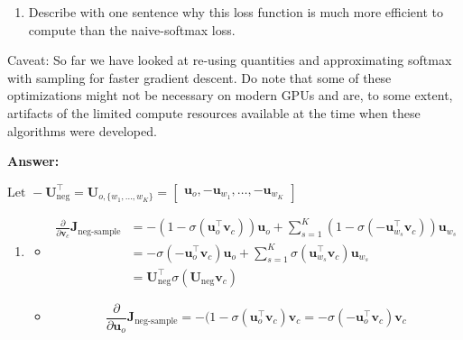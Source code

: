 \documentclass{article}
\newenvironment{answer}{
    {\bf Answer:} \sf \begingroup\color{black}
}{\endgroup}%
\begin{document}
\begin{enumerate}[label=(\alph*)]
\begin{enumerate}[label=(\roman*)]
              \item Describe with one sentence why this loss function is much more efficient to compute than the naive-softmax loss.
          \end{enumerate}

          Caveat: So far we have looked at re-using quantities and approximating softmax with sampling for faster gradient descent. Do note that some of these optimizations might not be necessary on modern GPUs and are, to some extent, artifacts of the limited compute resources available at the time when these algorithms were developed.

          \begin{shaded}
              \begin{answer}
                  $\text{Let } -\bm U_{\text{neg}}^\top = \bm{U}_{o, \{w_1, \dots, w_K\}} = \begin{bmatrix} \bm{u}_o, -\bm{u}_{w_1}, \dots, -\bm{u}_{w_K} \end{bmatrix}$
                  \begin{enumerate}[label=(\roman*)]
                      \item \begin{itemize}
                                \item
                                      \begin{align*}
                                          \frac{\partial}{\partial \bm v_{c}}\bm J_{\text{neg-sample}}
                                           & = -(1 - \sigma(\bm u_{o}^\top \bm v_{c})) \bm u_{o} + \sum_{s = 1}^K (1 - \sigma(-\bm u_{w_{s}}^\top \bm v_{c}))\bm u_{w_{s}} \\
                                           & = -\sigma(-\bm u_{o}^\top \bm v_{c})\bm u_{o} + \sum_{s = 1}^K \sigma(\bm u_{w_{s}}^\top \bm v_{c})\bm u_{w_{s}}              \\
                                           & = \bm U_{\text{neg}}^\top\sigma(\bm U_\text{neg} \bm v_c)
                                      \end{align*}
                                \item
                                      \begin{equation}
                                          \frac{\partial}{\partial \bm u_{o}}\bm J_{\text{neg-sample}}
                                          = -(1-\sigma(\bm u_{o}^\top \bm v_{c})\bm v_{c}
                                          = -\sigma(-\bm u_{o}^\top \bm v_{c})\bm v_{c}

\end{equation}
\end{itemize}
\end{enumerate}
\end{answer}
\end{shaded}
\end{enumerate}
\end{document}

